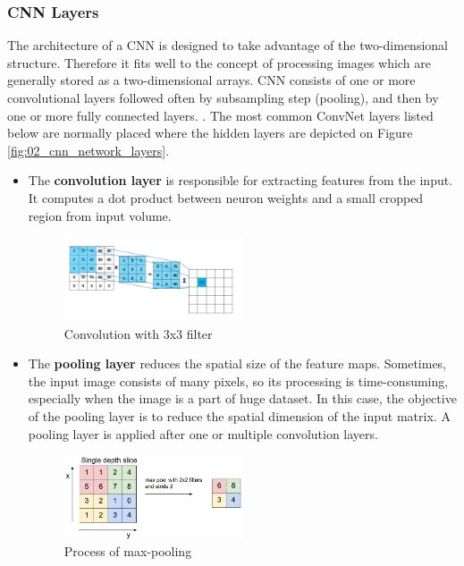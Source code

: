 \documentclass[../Main.tex]{subfiles}
\begin{document}
    \subsubsection{CNN Layers}
    The architecture of a CNN is designed to take advantage of the two-dimensional structure. Therefore it fits well to the concept of processing images which are generally stored as a two-dimensional arrays. CNN consists of one or more convolutional layers followed often by subsampling step (pooling), and then by one or more fully connected layers. \cite{dlstanford}. The most common ConvNet layers listed below are normally placed where the hidden layers are depicted on Figure \ref{fig:02_cnn_network_layers}. 
    \begin{itemize}
        \item The \textbf{convolution layer} is responsible for extracting features from the input. It computes a dot product between neuron weights and a small cropped region from input volume.
        \begin{figure}[ht!]
            \centering
            \includegraphics[width=0.5\textwidth]{Images/02_cnn_convolution.png}
            \caption{Convolution with 3x3 filter \cite{dlstanford}}
            \label{fig:cnn-convolution}
        \end{figure}
    
        \item The \textbf{pooling layer} reduces the spatial size of the feature maps. Sometimes, the input image consists of many pixels, so its processing is time-consuming, especially when the image is a part of huge dataset. In this case, the objective of the pooling layer is to reduce the spatial dimension of the input matrix. A pooling layer is applied after one or multiple convolution layers.
        \begin{figure}[ht!]
            \centering
            \includegraphics[width=0.5\textwidth]{Images/02_cnn_pooling.jpeg}
            \caption{Process of max-pooling \cite{dlstanford}}
            \label{fig:cnn-pooling}
        \end{figure}
        

\end{itemize}
\end{document}
